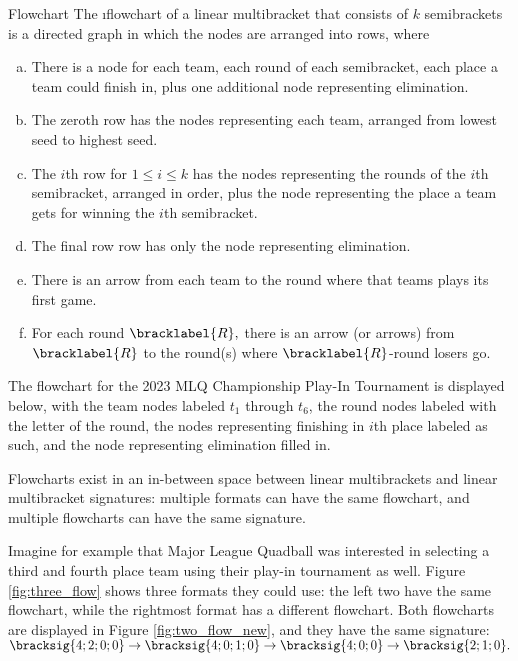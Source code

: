 {    \begin{definition}{Flowchart}{}
        The \i{flowchart} of a linear multibracket that consists of $k$ semibrackets is a directed graph in which the nodes are arranged into rows, where
        \begin{enumerate}[(a)]
            \item There is a node for each team, each round of each semibracket, each place a team could finish in, plus one additional node representing elimination.
            \item The zeroth row has the nodes representing each team, arranged from lowest seed to highest seed.
            \item The $i$th row for $1 \leq i \leq k$ has the nodes representing the rounds of the $i$th semibracket, arranged in order, plus the node representing the place a team gets for winning the $i$th semibracket.
            \item The final row row has only the node representing elimination.
            \item There is an arrow from each team to the round where that teams plays its first game.
            \item For each round $\bracklabel{R},$ there is an arrow (or arrows) from $\bracklabel{R}$ to the round(s) where $\bracklabel{R}$-round losers go.
        \end{enumerate}
    \end{definition}

    The flowchart for the 2023 MLQ Championship Play-In Tournament is displayed below, with the team nodes labeled $t_1$ through $t_6$, the round nodes labeled with the letter of the round, the nodes representing finishing in $i$th place labeled as such, and the node representing elimination filled in.


    Flowcharts exist in an in-between space between linear multibrackets and linear multibracket signatures: multiple formats can have the same flowchart, and multiple flowcharts can have the same signature.

    Imagine for example that Major League Quadball was interested in selecting a third and fourth place team using their play-in tournament as well. Figure \ref{fig:three_flow} shows three formats they could use: the left two have the same flowchart, while the rightmost format has a different flowchart. Both flowcharts are displayed in Figure \ref{fig:two_flow_new}, and they have the same signature:  $\bracksig{4;2;0;0} \to \bracksig{4;0;1;0} \to \bracksig{4;0;0} \to \bracksig{2;1;0}.$

}
